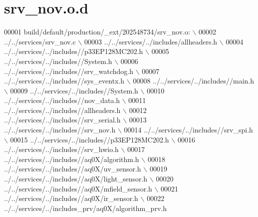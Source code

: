 \hypertarget{a00061_source}{\section{srv\+\_\+nov.\+o.\+d}
\label{a00061_source}
}

\begin{DoxyCode}
00001 build/\textcolor{keywordflow}{default}/production/\_ext/202548734/srv\_nov.o:  \(\backslash\)
00002  ../../services/srv\_nov.c  \(\backslash\)
00003 ../../services/../includes/allheaders.h  \(\backslash\)
00004 ../../services/../includes\textcolor{comment}{//p33EP128MC202.h  \(\backslash\)}
00005 \textcolor{comment}{../../services/../includes//System.h  \(\backslash\)}
00006 \textcolor{comment}{../../services/../includes//srv\_watchdog.h  \(\backslash\)}
00007 \textcolor{comment}{../../services/../includes//sys\_eventx.h  \(\backslash\)}
00008 \textcolor{comment}{../../services/../includes//main.h  \(\backslash\)}
00009 \textcolor{comment}{../../services/../includes//System.h  \(\backslash\)}
00010 \textcolor{comment}{../../services/../includes//nov\_data.h  \(\backslash\)}
00011 \textcolor{comment}{../../services/../includes//allheaders.h  \(\backslash\)}
00012 \textcolor{comment}{../../services/../includes//srv\_serial.h  \(\backslash\)}
00013 \textcolor{comment}{../../services/../includes//srv\_nov.h  \(\backslash\)}
00014 \textcolor{comment}{../../services/../includes//srv\_spi.h  \(\backslash\)}
00015 \textcolor{comment}{../../services/../includes//p33EP128MC202.h  \(\backslash\)}
00016 \textcolor{comment}{../../services/../includes//srv\_hwio.h  \(\backslash\)}
00017 \textcolor{comment}{../../services/../includes//aq0X/algorithm.h  \(\backslash\)}
00018 \textcolor{comment}{../../services/../includes//aq0X/uv\_sensor.h  \(\backslash\)}
00019 \textcolor{comment}{../../services/../includes//aq0X/light\_sensor.h  \(\backslash\)}
00020 \textcolor{comment}{../../services/../includes//aq0X/mfield\_sensor.h  \(\backslash\)}
00021 \textcolor{comment}{../../services/../includes//aq0X/ir\_sensor.h  \(\backslash\)}
00022 \textcolor{comment}{../../services/../includes\_prv/aq0X/algorithm\_prv.h }
\end{DoxyCode}

